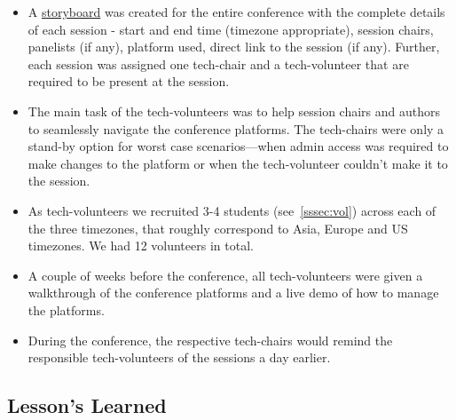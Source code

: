 \documentclass[%
10pt,								%
titlepage,						%
]
{scrartcl}
\begin{document}
\begin{itemize}
    \item A \href{https://docs.google.com/spreadsheets/d/1ENeS3DyxSxWQGRSsiMsHuddwmdlg6r_4tH6VTcvLgMg/edit?usp=sharing}{storyboard} was created for the entire conference with the complete details of each session - start and end time (timezone appropriate), session chairs, panelists (if any), platform used, direct link to the session (if any). Further, each session was assigned one tech-chair and a tech-volunteer that are required to be present at the session.
    \item The main task of the tech-volunteers was to help session chairs and authors to seamlessly navigate the conference platforms. The tech-chairs were only a stand-by option for worst case scenarios---when admin access was required to make changes to the platform or when the tech-volunteer couldn't make it to the session.
    \item As tech-volunteers we recruited 3-4 students (see~\ref{sssec:vol}) across each of the three timezones, that roughly correspond to Asia, Europe and US timezones. We had 12 volunteers in total.
    \item A couple of weeks before the conference, all tech-volunteers were given a walkthrough of the conference platforms and a live demo of how to manage the platforms.
    \item During the conference, the respective tech-chairs would remind the responsible tech-volunteers of the sessions a day earlier. 
\end{itemize}

\subsection{Lesson's Learned}
\end{document}
